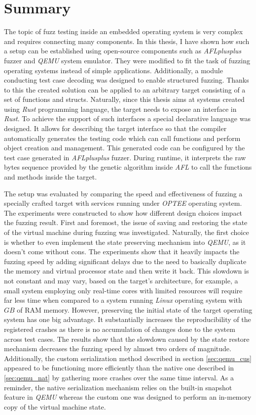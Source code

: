 \cleardoublepage
\section{Summary} \label{chap:summ}
The topic of fuzz testing inside an embedded operating system is very complex and requires connecting many components. In this thesis, I have shown how such a setup can be established using open-source components such as \textit{AFLplusplus} fuzzer and \textit{QEMU} system emulator. They were modified to fit the task of fuzzing operating systems instead of simple applications. Additionally, a module conducting test case decoding was designed to enable structured fuzzing. Thanks to this the created solution can be applied to an arbitrary target consisting of a set of functions and structs. Naturally, since this thesis aims at systems created using \textit{Rust} programming language, the target needs to expose an interface in \textit{Rust}. To achieve the support of such interfaces a special declarative language was designed. It allows for describing the target interface so that the compiler automatically generates the testing code which can call functions and perform object creation and management. This generated code can be configured by the test case generated in \textit{AFLplusplus} fuzzer. During runtime, it interprets the raw bytes sequence provided by the genetic algorithm inside \textit{AFL} to call the functions and methods inside the target.

The setup was evaluated by comparing the speed and effectiveness of fuzzing a specially crafted target with services running under \textit{OPTEE} operating system. The experiments were constructed to show how different design choices impact the fuzzing result. First and foremost, the issue of saving and restoring the state of the virtual machine during fuzzing was investigated. Naturally, the first choice is whether to even implement the state preserving mechanism into \textit{QEMU}, as it doesn't come without cons. The experiments show that it heavily impacts the fuzzing speed by adding significant delays due to the need to basically duplicate the memory and virtual processor state and then write it back. This slowdown is not constant and may vary, based on the target's architecture, for example, a small system employing only real-time cores with limited resources will require far less time when compared to a system running \textit{Linux} operating system with $GB$ of RAM memory. However, preserving the initial state of the target operating system has one big advantage. It substantially increases the reproducibility of the registered crashes as there is no accumulation of changes done to the system across test cases. The results show that the slowdown caused by the state restore mechanism decreases the fuzzing speed by almost two orders of magnitude. Additionally, the custom serialization method described in section \ref{sec:qemu_cus} appeared to be functioning more efficiently than the native one described in \ref{sec:qemu_nat} by gathering more crashes over the same time interval. As a reminder, the native serialization mechanism relies on the built-in snapshot feature in \textit{QEMU} whereas the custom one was designed to perform an in-memory copy of the virtual machine state.

